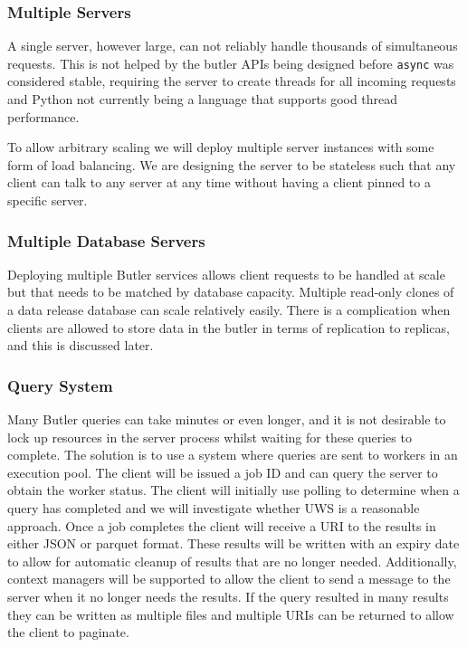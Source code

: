 \subsubsection{Multiple Servers}\label{multiple-servers}

A single server, however large, can not reliably handle thousands of simultaneous requests.
This is not helped by the butler APIs being designed before \texttt{async} was considered stable, requiring the server to create threads for all incoming requests and Python not currently being a language that supports good thread performance.

To allow arbitrary scaling we will deploy multiple server instances with some form of load balancing.
We are designing the server to be stateless such that any client can talk to any server at any time without having a client pinned to a specific server.

\subsubsection{Multiple Database Servers}\label{multiple-database-servers}

Deploying multiple Butler services allows client requests to be handled at scale but that needs to be matched by database capacity.
Multiple read-only clones of a data release database can scale relatively easily.
There is a complication when clients are allowed to store data in the butler in terms of replication to replicas, and this is discussed later.

\subsubsection{Query System}\label{query-system}

Many Butler queries can take minutes or even longer, and it is not desirable to lock up resources in the server process whilst waiting for these queries to complete.
The solution is to use a system where queries are sent to workers in an execution pool.
The client will be issued a job ID and can query the server to obtain the worker status.
The client will initially use polling to determine when a query has completed and we will investigate whether UWS \cite{2016ivoa.spec.1024H} is a reasonable approach.
Once a job completes the client will receive a URI to the results in either JSON or parquet format.
These results will be written with an expiry date to allow for automatic cleanup of results that are no longer
needed.
Additionally, context managers will be supported to allow the client to send a message to the server when it no longer needs the results.
If the query resulted in many results they can be written as multiple files and multiple URIs can be returned to allow the client to paginate.

